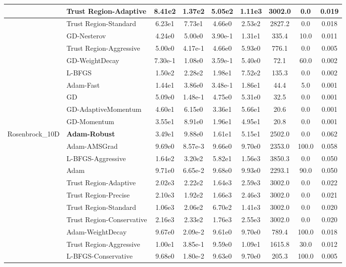 \documentclass{article}
\begin{document}
\begin{longtable}{|l|l|c|c|c|c|c|c|c|}
\hline
 & Trust Region-Adaptive & 8.41e2 & 1.37e2 & 5.05e2 & 1.11e3 & 3002.0 & 0.0 & 0.019 \\
\hline
 & Trust Region-Standard & 6.23e1 & 7.73e1 & 4.66e0 & 2.53e2 & 2827.2 & 0.0 & 0.018 \\
\hline
 & GD-Nesterov & 4.24e0 & 5.00e0 & 3.90e-1 & 1.31e1 & 335.4 & 10.0 & 0.011 \\
\hline
 & Trust Region-Aggressive & 5.00e0 & 4.17e-1 & 4.66e0 & 5.93e0 & 776.1 & 0.0 & 0.005 \\
\hline
 & GD-WeightDecay & 7.30e-1 & 1.08e0 & 3.59e-1 & 5.40e0 & 72.1 & 60.0 & 0.002 \\
\hline
 & L-BFGS & 1.50e2 & 2.28e2 & 1.98e1 & 7.52e2 & 135.3 & 0.0 & 0.002 \\
\hline
 & Adam-Fast & 1.44e1 & 3.86e0 & 3.48e-1 & 1.86e1 & 44.4 & 5.0 & 0.001 \\
\hline
 & GD & 5.09e0 & 1.48e-1 & 4.75e0 & 5.31e0 & 32.5 & 0.0 & 0.001 \\
\hline
 & GD-AdaptiveMomentum & 4.60e1 & 6.15e0 & 3.36e1 & 5.66e1 & 20.6 & 0.0 & 0.001 \\
\hline
 & GD-Momentum & 3.55e1 & 8.91e0 & 1.96e1 & 4.95e1 & 20.8 & 0.0 & 0.001 \\
Rosenbrock\_10D & \textbf{Adam-Robust} & 3.49e1 & 9.88e0 & 1.61e1 & 5.15e1 & 2502.0 & 0.0 & 0.062 \\
\hline
 & Adam-AMSGrad & 9.69e0 & 8.57e-3 & 9.66e0 & 9.70e0 & 2353.0 & 100.0 & 0.058 \\
\hline
 & L-BFGS-Aggressive & 1.64e2 & 3.20e2 & 5.82e1 & 1.56e3 & 3850.3 & 0.0 & 0.050 \\
\hline
 & Adam & 9.71e0 & 6.65e-2 & 9.68e0 & 9.93e0 & 2293.1 & 90.0 & 0.050 \\
\hline
 & Trust Region-Adaptive & 2.02e3 & 2.22e2 & 1.64e3 & 2.59e3 & 3002.0 & 0.0 & 0.022 \\
\hline
 & Trust Region-Precise & 2.10e3 & 1.92e2 & 1.66e3 & 2.46e3 & 3002.0 & 0.0 & 0.021 \\
\hline
 & Trust Region-Standard & 1.06e3 & 2.06e2 & 6.70e2 & 1.41e3 & 3002.0 & 0.0 & 0.020 \\
\hline
 & Trust Region-Conservative & 2.16e3 & 2.33e2 & 1.76e3 & 2.55e3 & 3002.0 & 0.0 & 0.020 \\
\hline
 & Adam-WeightDecay & 9.67e0 & 2.09e-2 & 9.61e0 & 9.70e0 & 789.4 & 100.0 & 0.018 \\
\hline
 & Trust Region-Aggressive & 1.00e1 & 3.85e-1 & 9.59e0 & 1.09e1 & 1615.8 & 30.0 & 0.012 \\
\hline
 & L-BFGS-Conservative & 9.68e0 & 1.80e-2 & 9.63e0 & 9.70e0 & 205.3 & 100.0 & 0.005 \\

\end{longtable}
\end{document}
